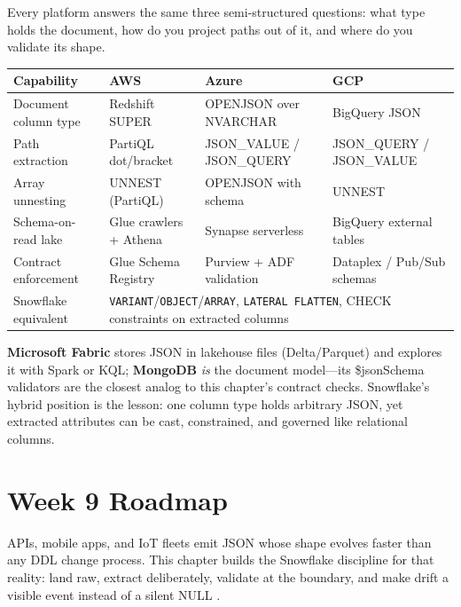 \begin{crosscloud}
Every platform answers the same three semi-structured questions: what type holds the document, how do you project paths out of it, and where do you validate its shape.

\vspace{2mm}
{\footnotesize
\begin{tabular}{@{}p{2.8cm}p{3.0cm}p{3.0cm}p{3.0cm}@{}}
\toprule
\textbf{Capability} & \textbf{AWS} & \textbf{Azure} & \textbf{GCP} \\
\midrule
Document column type & Redshift SUPER & OPENJSON over NVARCHAR & BigQuery JSON \\
Path extraction & PartiQL dot/bracket & JSON\_VALUE / JSON\_QUERY & JSON\_QUERY / JSON\_VALUE \\
Array unnesting & UNNEST (PartiQL) & OPENJSON with schema & UNNEST \\
Schema-on-read lake & Glue crawlers + Athena & Synapse serverless & BigQuery external tables \\
Contract enforcement & Glue Schema Registry & Purview + ADF validation & Dataplex / Pub/Sub schemas \\
\addlinespace
Snowflake equivalent & \multicolumn{3}{l}{\texttt{VARIANT}/\texttt{OBJECT}/\texttt{ARRAY}, \texttt{LATERAL FLATTEN}, CHECK constraints on extracted columns} \\
\bottomrule
\end{tabular}}

\vspace{1mm}
\textbf{Microsoft Fabric} stores JSON in lakehouse files (Delta/Parquet) and explores it with Spark or KQL; \textbf{MongoDB} \emph{is} the document model---its \$jsonSchema validators are the closest analog to this chapter's contract checks. Snowflake's hybrid position is the lesson: one column type holds arbitrary JSON, yet extracted attributes can be cast, constrained, and governed like relational columns.
\end{crosscloud}

\section{Week 9 Roadmap}
APIs, mobile apps, and IoT fleets emit JSON whose shape evolves faster than any DDL change process. This chapter builds the Snowflake discipline for that reality: land raw, extract deliberately, validate at the boundary, and make drift a visible event instead of a silent NULL \cite{snowflakeSemiStructuredDocs}.

